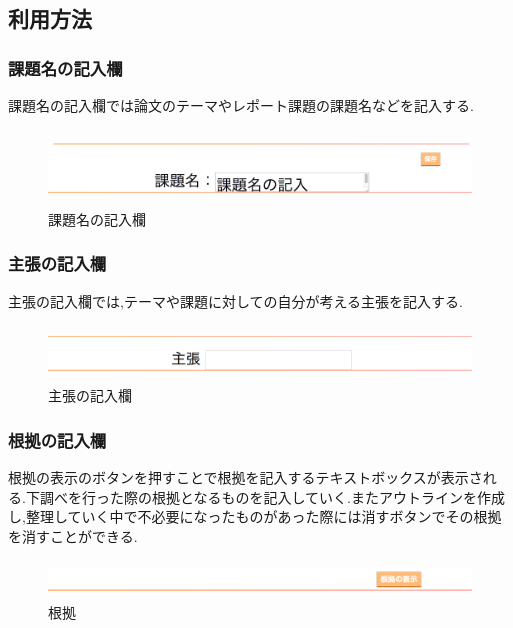 \documentclass[a4j,12pt]{jarticle}
\begin{document}
\newpage

\subsection{利用方法}
\subsubsection{課題名の記入欄}
課題名の記入欄では論文のテーマやレポート課題の課題名などを記入する.
\begin{figure}[h]
\begin{center}
 \includegraphics[clip,width=150mm,height=20mm]{00kadai.png}
\end{center}
 \caption{課題名の記入欄}
 \label{fig:h}
\end{figure}

\subsubsection{主張の記入欄}
主張の記入欄では,テーマや課題に対しての自分が考える主張を記入する.
\begin{figure}[h]
\begin{center}
 \includegraphics[clip,width=150mm,height=15mm]{01shucho.png}
\end{center}
 \caption{主張の記入欄}
 \label{fig:i}
\end{figure}
\newpage
\subsubsection{根拠の記入欄}
根拠の表示のボタンを押すことで根拠を記入するテキストボックスが表示される.下調べを行った際の根拠となるものを記入していく.またアウトラインを作成し,整理していく中で不必要になったものがあった際には消すボタンでその根拠を消すことができる.
\begin{figure}[h]
\begin{center}
 \includegraphics[clip,width=150mm,height=10mm]{02konkyo.png}
\end{center}
 \caption{根拠}
 \label{fig:j}
\end{figure}
\end{document}
